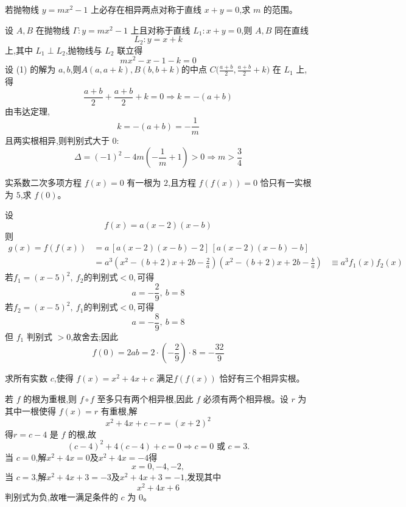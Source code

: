 \begin{questions}
    \question 若抛物线 $y = mx^2 - 1$ 上必存在相异两点对称于直线 $x+y=0$,求 $m$ 的范围。
    \begin{solution}
        设 $A, B$ 在抛物线 $\Gamma:y = mx^2 - 1$ 上且对称于直线 $L_1:x+y=0$,则 $A, B$ 同在直线 $$L_2:y = x + k$$ 上,其中 $L_1 \perp L_2$,抛物线与 $L_2$ 联立得
        \[
        mx^2 - x - 1 - k = 0 \tag{1}
        \]
        设 (1) 的解为 $a, b$,则$A(a, a+k), B(b, b+k)$的中点 $C\Big(\frac{a+b}{2}, \frac{a+b}{2}+k\Big)$ 在 $L_1$ 上,得
        \[
        \frac{a+b}{2} + \frac{a+b}{2} + k = 0 \Rightarrow k = -(a+b)
        \]
        由韦达定理,
        \[
        k = -(a+b) = -\frac{1}{m}
        \]
        且两实根相异,则判别式大于 $0$:
        \[
        \Delta = (-1)^2 - 4m(-\frac{1}{m} + 1) > 0  \Rightarrow m > \frac{3}{4}
        \]
    \end{solution}

    \question 实系数二次多项方程 $f(x)=0$ 有一根为 $2$,且方程 $f(f(x))=0$ 恰只有一实根为 $5$,求 $f(0)$。
    \begin{solution}
        设
        \[
        f(x)=a(x-2)(x-b)
        \]
        则
        \begin{align*}
        g(x)=f(f(x))
        &=a\,[a(x-2)(x-b)-2]\,[a(x-2)(x-b)-b]\\
        &=a^3\left(x^2-(b+2)x+2b-\frac{2}{a}\right)\left(x^2-(b+2)x+2b-\frac{b}{a}\right)
        &\equiv a^3 f_1(x) f_2(x)
        \end{align*}
        若$f_1=(x-5)^2,\ f_2 \text{的判别式} < 0,$可得
        \[
        a=-\frac{2}{9},\ b=8
        \]
        若$f_2=(x-5)^2,\ f_1 \text{的判别式} < 0,$可得
        \[
        a=-\frac{8}{9},\ b=8
        \]
        但 $f_1$ 判别式 $>0$,故舍去;因此
        \[
        f(0)=2ab = 2 \cdot \left(-\frac{2}{9}\right) \cdot 8 = -\frac{32}{9}
        \]
    \end{solution}

    \question 求所有实数 $c$,使得 $f(x)=x^{2}+4x+c$ 满足$f(f(x))$ 恰好有三个相异实根。
    \begin{solution}
        若 $f$ 的根为重根,则 $f \circ f$ 至多只有两个相异根,因此 $f$ 必须有两个相异根。设 $r$ 为其中一根使得 $f(x)=r$ 有重根,解
        \[
        x^2 + 4x + c - r = (x+2)^2
        \]
        得$r=c-4$ 是 $f$ 的根,故
        \[
        (c-4)^2 + 4(c-4) + c = 0 \Rightarrow c=0 \text{ 或 } c=3.
        \]
        当 $c=0$,解$x^2+4x=0$及$x^2+4x=-4$得
        \[
        x=0,-4,-2,
        \]
        当 $c=3$,解$x^2+4x+3=-3$及$x^2+4x+3=-1$,发现其中
        \[
        x^2+4x+6
        \]
        判别式为负,故唯一满足条件的 $c$ 为 $0$。
    \end{solution}


\end{questions}
